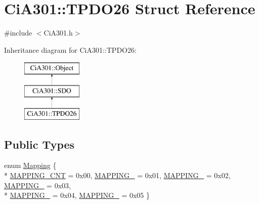 \hypertarget{struct_ci_a301_1_1_t_p_d_o26}{\section{Ci\-A301\-:\-:T\-P\-D\-O26 Struct Reference}
\label{struct_ci_a301_1_1_t_p_d_o26}
}


{\ttfamily \#include $<$Ci\-A301.\-h$>$}

Inheritance diagram for Ci\-A301\-:\-:T\-P\-D\-O26\-:\begin{figure}[H]
\begin{center}
\leavevmode
\includegraphics[height=3.000000cm]{d1/da0/struct_ci_a301_1_1_t_p_d_o26}
\end{center}
\end{figure}
\subsection*{Public Types}
\begin{DoxyCompactItemize}
\item 
enum \hyperlink{struct_ci_a301_1_1_t_p_d_o26_ad26fbc2e8ca095342bf5ca3ad7b3a568}{Mapping} \{ \\*
\hyperlink{struct_ci_a301_1_1_t_p_d_o26_ad26fbc2e8ca095342bf5ca3ad7b3a568a65c22c821b136b05d44fc7212851d29e}{M\-A\-P\-P\-I\-N\-G\-\_\-\-C\-N\-T} = 0x00, 
\hyperlink{struct_ci_a301_1_1_t_p_d_o26_ad26fbc2e8ca095342bf5ca3ad7b3a568a63899665bdb19bfede91de2dd2d3bfdd}{M\-A\-P\-P\-I\-N\-G\-\_} = 0x01, 
\hyperlink{struct_ci_a301_1_1_t_p_d_o26_ad26fbc2e8ca095342bf5ca3ad7b3a568a9229c49da4305df3f4123c998a811309}{M\-A\-P\-P\-I\-N\-G\-\_} = 0x02, 
\hyperlink{struct_ci_a301_1_1_t_p_d_o26_ad26fbc2e8ca095342bf5ca3ad7b3a568aba0cd6d82630852876cb19619f20b525}{M\-A\-P\-P\-I\-N\-G\-\_} = 0x03, 
\\*
\hyperlink{struct_ci_a301_1_1_t_p_d_o26_ad26fbc2e8ca095342bf5ca3ad7b3a568a7da0896c5958e41e0565bfd92f7a0fcb}{M\-A\-P\-P\-I\-N\-G\-\_} = 0x04, 
\hyperlink{struct_ci_a301_1_1_t_p_d_o26_ad26fbc2e8ca095342bf5ca3ad7b3a568a9166dd42bc1fd26e6f10ff1a880d196e}{M\-A\-P\-P\-I\-N\-G\-\_} = 0x05
 \}
\end{DoxyCompactItemize}
